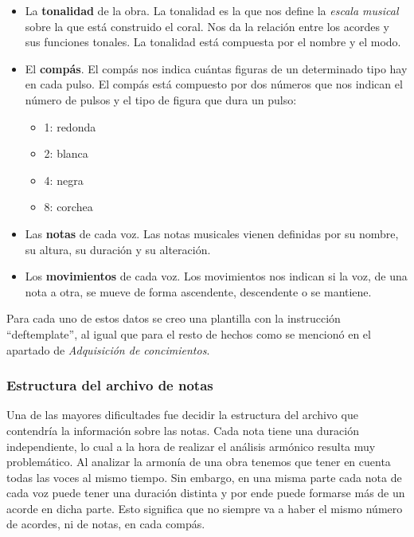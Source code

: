 \begin{itemize}

	\item La \textbf{tonalidad} de la obra. La tonalidad es la que nos define la \textit{escala musical} sobre la que está construido el coral. Nos da la relación entre los acordes y sus funciones tonales. La tonalidad está compuesta por el nombre y el modo.

	\item El \textbf{compás}. El compás nos indica cuántas figuras de un determinado tipo hay en cada pulso. El compás está compuesto por dos números que nos indican el número de pulsos y el tipo de figura que dura un pulso:

	\begin{itemize}
		\item 1: redonda
		\item 2: blanca
		\item 4: negra
		\item 8: corchea
	\end{itemize}

	\item Las \textbf{notas} de cada voz. Las notas musicales vienen definidas por su nombre, su altura, su duración y su alteración.

	\item Los \textbf{movimientos} de cada voz. Los movimientos nos indican si la voz, de una nota a otra, se mueve de forma ascendente, descendente o se mantiene.

\end{itemize}

Para cada uno de estos datos se creo una plantilla con la instrucción ``deftemplate'', al igual que para el resto de hechos como se mencionó en el apartado de \textit{Adquisición de concimientos}. 

\subsubsection{Estructura del archivo de notas}

Una de las mayores dificultades fue decidir la estructura del archivo que contendría la información sobre las notas. Cada nota tiene una duración independiente, lo cual a la hora de realizar el análisis armónico resulta muy problemático. Al analizar la armonía de una obra tenemos que tener en cuenta todas las voces al mismo tiempo. Sin embargo, en una misma parte cada nota de cada voz puede tener una duración distinta y por ende puede formarse más de un acorde en dicha parte. Esto significa que no siempre va a haber el mismo número de acordes, ni de notas, en cada compás.

